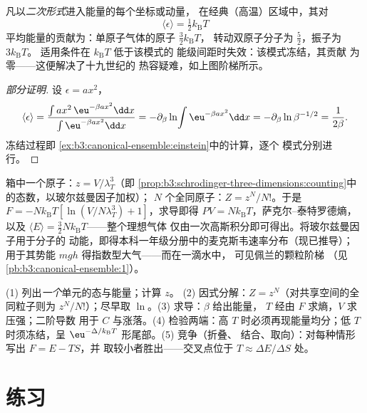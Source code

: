 \begin{theorem}[能量均分定理及其适用条件]\label{thm:b3:canonical-ensemble:equipartition}
凡以\emph{二次形式}进入能量的每个坐标或动量，
在经典（高温）区域中，其对
\[
\langle\epsilon\rangle = \tfrac12 k_{\text{B}}T
\]
平均能量的贡献为：单原子气体的原子 $\tfrac32 k_{\text{B}}T$，
转动双原子分子为 $\tfrac52$，振子为 $3k_{\text{B}}T$。
适用条件在 $k_{\text{B}}T$ 低于该模式的
能级间距时失效：该模式冻结，其贡献
为零——这便解决了十九世纪的
热容疑难，如上图阶梯所示。
\end{theorem}

\begin{proof}[部分证明]
设 $\epsilon = ax^2$，
\[
\langle\epsilon\rangle
 = \frac{\int ax^2\,\eu^{-\beta ax^2}\dd x}
        {\int\eu^{-\beta ax^2}\dd x}
 = -\partial_\beta\ln\!\int\eu^{-\beta ax^2}\dd x
 = -\partial_\beta\ln\beta^{-1/2} = \frac{1}{2\beta} .
\] 冻结过程即
\cref{ex:b3:canonical-ensemble:einstein}中的计算，逐个
模式分别进行。
\end{proof}

\begin{example}[正则系综下的气体]\label{ex:b3:canonical-ensemble:gas}
箱中一个原子：$z = V/\lambda_T^3$（即
\cref{prop:b3:schrodinger-three-dimensions:counting}中的态数，以玻尔兹曼因子加权）；
$N$ 个全同原子：$Z = z^N/N!$。于是 $F =
-Nk_{\text{B}}T[\ln(V/N\lambda_T^3) + 1]$，求导即得
$PV = Nk_{\text{B}}T$，萨克尔–泰特罗德熵，以及
$\langle E\rangle = \tfrac32 Nk_{\text{B}}T$——整个理想气体
仅由一次高斯积分即可得出。将玻尔兹曼因子用于分子的
动能，即得本科一年级分册中的麦克斯韦速率分布（现已推导）；
用于其势能
$mgh$ 得指数型大气——而在一滴水中，
可见佩兰的颗粒阶梯
（见\cref{pb:b3:canonical-ensemble:1}）。
\end{example}

\begin{method}[正则计算技巧]\label{met:b3:canonical-ensemble:method}
(1) 列出\emph{一个}单元的态与能量；计算 $z$。
(2) 因式分解：$Z = z^N$（对共享空间的全同粒子则为
$z^N/N!$）；尽早取 $\ln$。(3) 求导：$\beta$ 给出能量，
$T$ 经由 $F$ 求熵，$V$ 求压强；二阶导数
用于 $C$ 与涨落。(4) 检验两端：高 $T$
时必须再现能量均分；低 $T$ 时须冻结，呈
$\eu^{-\Delta/k_{\text{B}}T}$ 形尾部。(5) 竞争（折叠、
结合、取向）：对每种情形写出 $F = E - TS$，并
取较小者胜出——交叉点位于 $T \approx \Delta
E/\Delta S$ 处。
\end{method}

\section{练习}

